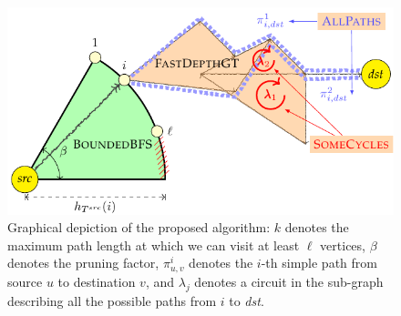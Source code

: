 \documentclass[sigconf]{acmart}
\begin{document}
\begin{figure}[!t]
\includegraphics[width=\linewidth]{fig/algo_intuition}
\caption{Graphical depiction of the proposed algorithm: $k$ denotes the maximum path length at which we can visit at least $\ell$ vertices, $\beta$ denotes the pruning factor, $\pi_{u,v}^i$ denotes the $i$-th simple path from source $u$ to destination $v$, and $\lambda_j$ denotes a circuit in the sub-graph describing all the possible paths from $i$ to \textit{dst}.}\label{fig:depict}
\end{figure}
\end{document}
